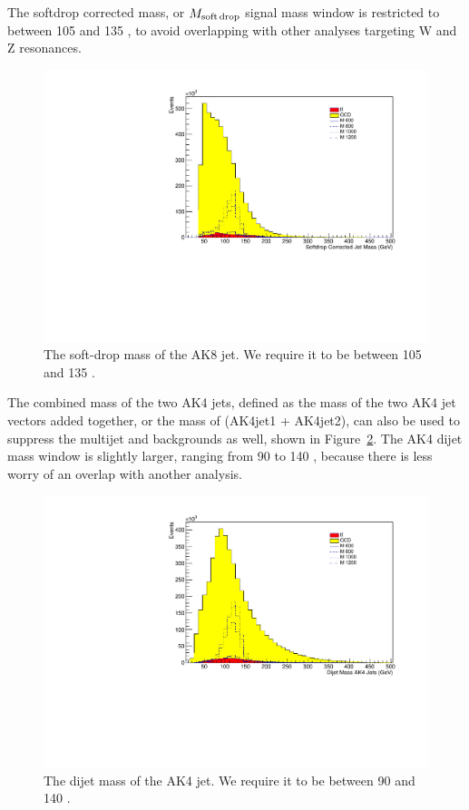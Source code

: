 The softdrop corrected mass, or $M_{\rm soft\,drop}$ signal mass window is restricted to between 105 and 135 \GeV, to avoid overlapping with other analyses targeting W and Z resonances. 

\begin{figure}[thb!]
\begin{center}
\includegraphics[scale=0.5]{F5/shapejetmass.pdf}
\end{center}
\caption{The soft-drop mass of the AK8 jet. We require it to be between 105 and 135 \GeV.}
\label{fig:AK8mass}
\end{figure} 

The combined mass of the two AK4 jets, defined as the mass of the two AK4 jet vectors added together, or the mass of (AK4jet1 + AK4jet2), can also be used to suppress the multijet and \ttbar backgrounds as well, shown in Figure~\ref{fig:AK4dijetmass}. The AK4 dijet mass window is slightly larger, ranging from 90 to 140 \GeV, because there is less worry of an overlap with another analysis.

\begin{figure}[thb!]
\begin{center}
\includegraphics[scale=0.5]{F5/shapedijetmass.pdf}
\end{center}
\caption{The dijet mass of the AK4 jet. We require it to be between 90 and 140 \GeV.}
\label{fig:AK4dijetmass}
\end{figure}

